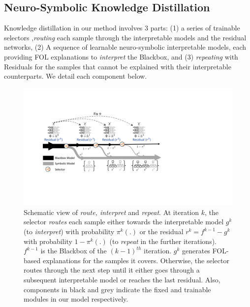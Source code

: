 \subsection{Neuro-Symbolic Knowledge Distillation}
Knowledge distillation in our method involves 3 parts: (1) a series of trainable selectors ,\emph{routing} each sample through the interpretable models and the residual networks, (2) A sequence of learnable neuro-symbolic interpretable models, each providing FOL explanations to \emph {interpret} the Blackbox, and (3) \emph{repeating} with Residuals for the samples that cannot be explained with their interpretable counterparts. 
We detail each component below.

\begin{figure}[h]
\centering
\includegraphics[width=\columnwidth]{figures/main/schematic.pdf}
\vskip -3pt
\caption{Schematic view of \emph{route, interpret} and \emph{repeat}. At iteration $k$, the selector \emph{routes} each sample either towards the interpretable model $g^k$ (to \emph{interpret}) with probability $\pi^k(.)$ or the residual $r^k = f^{k-1} - g^k$ with probability $1-\pi^k(.)$ (to \emph{repeat} in the further iterations). $f^{k-1}$ is the Blackbox of the $(k-1)^{th}$ iteration. $g^k$ generates FOL-based explanations for the samples it covers. Otherwise, the selector routes through the next step until it either goes through a subsequent interpretable model or reaches the last residual. Also, components in black and grey indicate the fixed and trainable modules in our model respectively. }
\label{fig:Schematic} 
\vskip -0.1in
\end{figure}

